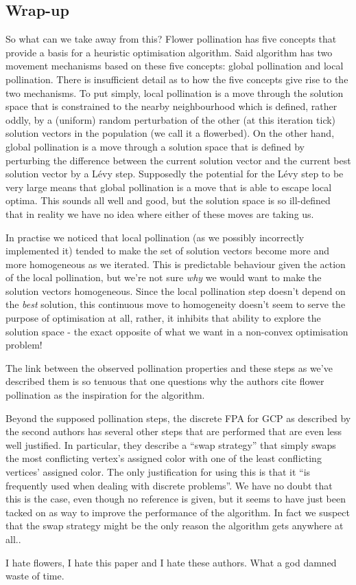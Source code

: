 \subsection{Wrap-up}
So what can we take away from this? Flower pollination has five concepts that provide a basis for a heuristic optimisation algorithm. Said algorithm has two movement mechanisms based on these five concepts: global pollination and local pollination. There is insufficient detail as to how the five concepts give rise to the two mechanisms.
To put simply, local pollination is a move through the solution space that is constrained to the nearby neighbourhood which is defined, rather oddly, by a (uniform) random perturbation of the other (at this iteration tick) solution vectors in the population (we call it a flowerbed). On the other hand, global pollination is a move through a solution space that is defined by perturbing the difference between the current solution vector and the current best solution vector by a L\'evy step. Supposedly the potential for the L\'evy step to be very large means that global pollination is a move that is able to escape local optima. This sounds all well and good, but the solution space is so ill-defined that in reality we have no idea where either of these moves are taking us. 

In practise we noticed that local pollination (as we possibly incorrectly implemented it) tended to make the set of solution vectors become more and more homogeneous as we iterated. This is predictable behaviour given the action of the local pollination, but we're not sure \emph{why} we would want to make the solution vectors homogeneous. Since the local pollination step doesn't depend on the \emph{best} solution, this continuous move to homogeneity doesn't seem to serve the purpose of optimisation at all, rather, it inhibits that ability to explore the solution space - the exact opposite of what we want in a non-convex optimisation problem!

The link between the observed pollination properties and these steps as we've described them is so tenuous that one questions why the authors cite flower pollination as the inspiration for the algorithm.

Beyond the supposed pollination steps, the discrete FPA for GCP as described by the second authors has several other steps that are performed that are even less well justified. In particular, they describe a ``swap strategy'' that simply swaps the most conflicting vertex's assigned color with one of the least conflicting vertices' assigned color. The only justification for using this is that it ``is frequently used when dealing with discrete problems''. We have no doubt that this is the case, even though no reference is given, but it seems to have just been tacked on as way to improve the performance of the algorithm. In fact we suspect that the swap strategy might be the only reason the algorithm gets anywhere at all..

I hate flowers, I hate this paper and I hate these authors. What a god damned waste of time.


